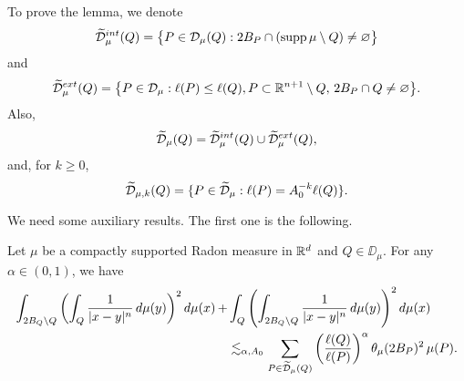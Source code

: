 To prove the lemma, we denote
\begin{equation}\label{eqdmuint}
	{\widetilde{{\mathcal D}}}_\mu^{int}(Q) = \big\{P\in{\mathcal D}_\mu(Q):2B_P\cap (\operatorname{supp}\mu\setminus Q)\neq \varnothing\big\}
\end{equation}
and
\begin{equation}\label{eqdmuext}
	{\widetilde{{\mathcal D}}}_\mu^{ext}(Q) = \big\{P\in{\mathcal D}_\mu:\ell(P)\leq \ell(Q),P\subset {\mathbb R}^{n+1}\setminus Q,\,2B_P\cap Q\neq \varnothing\big\}.
\end{equation}
Also,
\begin{equation}\label{eqdmutot}
	{\widetilde{{\mathcal D}}}_\mu(Q) = {\widetilde{{\mathcal D}}}_\mu^{int}(Q) \cup {\widetilde{{\mathcal D}}}_\mu^{ext}(Q),
\end{equation}
and, for $k\geq0$,
$${\widetilde{{\mathcal D}}}_{\mu,k}(Q) = 
\{P\in{\widetilde{{\mathcal D}}}_\mu:\ell(P)=  A_0^{-k}\ell(Q)\}.$$

We need some auxiliary results. The first one is the following.

\begin{lemma}\label{lemDMimproved2}
	Let $\mu$ be a compactly supported Radon measure in ${\mathbb R}^{d}$ and $Q\in\DD_\mu$. For any  $\alpha\in(0,1)$, we have
	\begin{align}\label{eqdosint}
		\int_{2B_Q\setminus Q}\left(\int_Q \frac1{|x-y|^n}\,d\mu(y)\right)^2d\mu(x) \,
		+ &\int_{Q}\left(\int_{2B_Q\setminus Q} \frac1{|x-y|^n}\,d\mu(y)\right)^2d\mu(x) \\
		& \lesssim_{\alpha,A_0}
		\sum_{P\in{\widetilde{{\mathcal D}}}_\mu(Q)} \left(\frac{\ell(Q)}{\ell(P)}\right)^\alpha\theta_\mu(2B_P)^2
		\,\mu(P).\nonumber
	\end{align}
\end{lemma}


